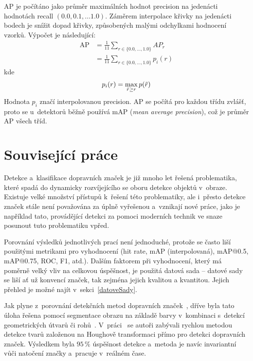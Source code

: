 AP je počítáno jako průměr maximálních hodnot precision na jedenácti hodnotách recall $(0.0, 0.1, ... 1.0)$. Záměrem interpolace křivky na jedenácti bodech je snížit dopad  křivky, způsobených malými odchylkami hodnocení vzorků. Výpočet je následující:
\begin{align}
    \label{eq:map}
    \mathrm{AP} &= \frac{1}{11} \sum\limits_{r \in \{0.0,...,1.0\}} AP_r\\ &= \frac{1}{11} \sum\limits_{r \in \{0.0,...,1.0\}} p_{i}(r)
\end{align}
kde
\begin{align}
    \label{eq:interpol}
    p_{i}(r) = \max\limits_{\Tilde{r} \geq r} p(\Tilde{r})
\end{align}
Hodnota $p_{i}$ značí interpolovanou precision. AP se počítá pro každou třídu zvlášť, proto se u~detektorů běžně používá mAP (\emph{mean average precision}), což je průměr AP všech tříd.




\section{Související práce}
\label{existujiciReseni}
Detekce a~klasifikace dopravních značek je již mnoho let řešená problematika, které spadá do dynamicky rozvíjejícího se oboru detekce objektů v~obraze. Existuje velké množství přístupů k~řešení této problematiky, ale i~přesto detekce značek stále není považována za úplně vyřešenou a~vznikají nové práce, jako je například tato, provádějící detekci za pomoci moderních technik ve snaze posunout tuto problematiku vpřed.

Porovnání výsledků jednotlivých prací není jednoduché, protože se často liší použitými metrikami pro vyhodnocení (hit rate, mAP (interpolovaná), mAP@0.5, mAP@0.75, ROC, F1, atd.). Dalším faktorem při vyhodnocení, který má poměrně velký vliv na celkovou úspěšnost, je použitá datová sada -- datové sady se liší ať už konvencí značek, tak zejména jejich kvalitou a kvantitou. Jejich přehled je možné najít v~sekci~\ref{datoveSady}.

Jak plyne z~porovnání detekčních metod dopravních značek~\cite{tsDetectOverview}, dříve byla tato úloha řešena pomocí segmentace obrazu na základě barvy v~kombinaci s~detekcí geometrických útvarů či rohů~\cite{tsDetect}. V~práci~\cite{fastShapeTSD} se autoři zabývali rychlou metodou detekce tvarů založenou na Houghově transformaci přímo pro detekci dopravních značek. Výsledkem byla $95\,\%$ úspěšnost detekce a~metoda je navíc invariantní vůči natočení značky a~pracuje v~reálném čase.


